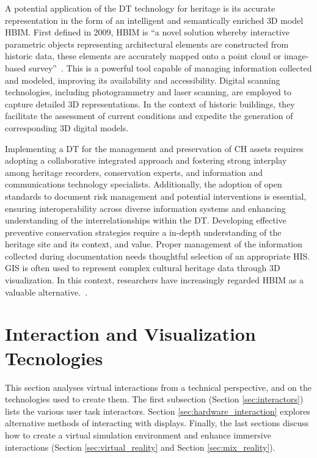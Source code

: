 A potential application of the \gls{DT} technology for heritage is its accurate
representation in the form of an intelligent and semantically enriched \gls{3D} model \gls{HBIM}.
First defined in 2009, HBIM is “a novel solution whereby interactive parametric objects representing architectural elements are constructed from historic data, these elements are accurately mapped onto a point cloud or image-based survey”~\cite{article_hbim}.
This is a powerful tool capable of managing information collected and modeled,
improving its availability and accessibility.
Digital scanning technologies, including photogrammetry and laser scanning, are employed to capture detailed \gls{3D} representations. In the context of historic buildings, they facilitate the assessment of current conditions and expedite the generation of corresponding \gls{3D} digital models.

Implementing a \gls{DT} for the management and preservation of \gls{CH} assets requires adopting a collaborative integrated approach and fostering strong interplay among heritage recorders, conservation experts, and information and communications technology specialists. 
Additionally, the adoption of open standards to document risk management and potential interventions is essential, ensuring interoperability across diverse information systems and enhancing understanding of the interrelationships within the \gls{DT}.
Developing effective preventive conservation strategies require a in-depth understanding of the heritage site and its context, and value.
Proper management of the information collected during documentation needs thoughtful selection of an appropriate \gls{HIS}.
\gls{GIS} is often used to represent complex cultural heritage data through \gls{3D} visualization. 
In this context, researchers have increasingly regarded \gls{HBIM} as a valuable alternative.~\cite{jouan2020digital}.


\section{Interaction and Visualization Tecnologies}
\label{sec:interaction_visualization}

This section analyses virtual interactions from a technical perspective, and on the technologies used to create them.
The first subsection (Section \ref{sec:interactors}) lists the various user task interactors. 
Section \ref{sec:hardware_interaction} explores alternative methods of interacting with displays. 
Finally, the last sections discuss how to create a virtual simulation environment and enhance immersive interactions (Section \ref{sec:virtual_reality} and Section  \ref{sec:mix_reality}).

